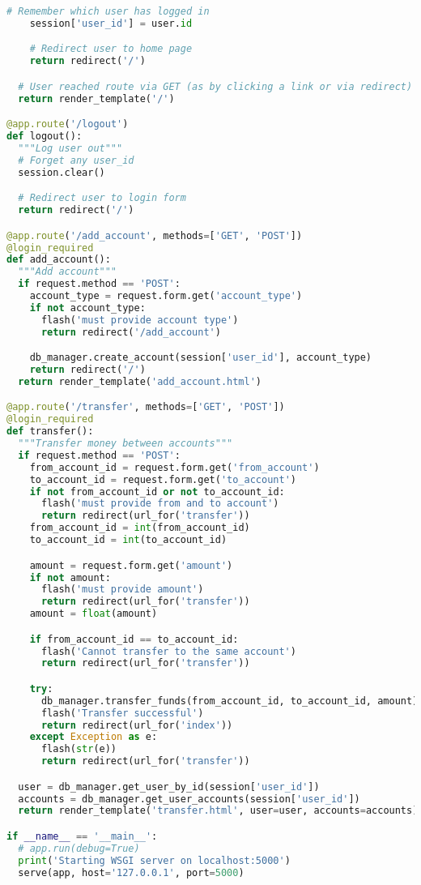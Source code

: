 \begin{lstlisting}[language=Python]
    # Remember which user has logged in
    session['user_id'] = user.id

    # Redirect user to home page
    return redirect('/')

  # User reached route via GET (as by clicking a link or via redirect)
  return render_template('/')

@app.route('/logout')
def logout():
  """Log user out"""
  # Forget any user_id
  session.clear()

  # Redirect user to login form
  return redirect('/')

@app.route('/add_account', methods=['GET', 'POST'])
@login_required
def add_account():
  """Add account"""
  if request.method == 'POST':
    account_type = request.form.get('account_type')
    if not account_type:
      flash('must provide account type')
      return redirect('/add_account')

    db_manager.create_account(session['user_id'], account_type)
    return redirect('/')
  return render_template('add_account.html')

@app.route('/transfer', methods=['GET', 'POST'])
@login_required
def transfer():
  """Transfer money between accounts"""
  if request.method == 'POST':
    from_account_id = request.form.get('from_account')
    to_account_id = request.form.get('to_account')
    if not from_account_id or not to_account_id:
      flash('must provide from and to account')
      return redirect(url_for('transfer'))
    from_account_id = int(from_account_id)
    to_account_id = int(to_account_id)

    amount = request.form.get('amount')
    if not amount:
      flash('must provide amount')
      return redirect(url_for('transfer'))
    amount = float(amount)

    if from_account_id == to_account_id:
      flash('Cannot transfer to the same account')
      return redirect(url_for('transfer'))

    try:
      db_manager.transfer_funds(from_account_id, to_account_id, amount)
      flash('Transfer successful')
      return redirect(url_for('index'))
    except Exception as e:
      flash(str(e))
      return redirect(url_for('transfer'))

  user = db_manager.get_user_by_id(session['user_id'])
  accounts = db_manager.get_user_accounts(session['user_id'])
  return render_template('transfer.html', user=user, accounts=accounts)

if __name__ == '__main__':
  # app.run(debug=True)
  print('Starting WSGI server on localhost:5000')
  serve(app, host='127.0.0.1', port=5000)

\end{lstlisting}

